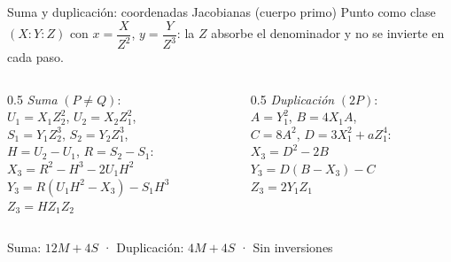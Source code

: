 \documentclass[aspectratio=169,11pt]{beamer}
\begin{document}
\begin{frame}{Suma y duplicación: coordenadas Jacobianas (cuerpo primo)}
  \small
  \setlength{\fboxsep}{2pt}
  \setlength{\parskip}{0pt}
  Punto como clase $(X{:}Y{:}Z)$ con $x=\dfrac{X}{Z^2}$, $y=\dfrac{Y}{Z^3}$:
  la $Z$ absorbe el denominador y \alert{no se invierte en cada paso}.
  \vspace{1ex}
  \begin{columns}[t]
    \begin{column}{0.5\textwidth}
      \emph{Suma} $(P\neq Q)$:\\[0.4ex]
      $U_1{=}X_1Z_2^2$, \quad $U_2{=}X_2Z_1^2$,\\
      $S_1{=}Y_1Z_2^3$, \quad $S_2{=}Y_2Z_1^3$,\\
      $H{=}U_2{-}U_1$, \quad $R{=}S_2{-}S_1$:\\[0.8ex]
      $\boxed{X_3=R^2-H^3-2U_1H^2}$\\[0.5ex]
      $\boxed{Y_3=R(U_1H^2-X_3)-S_1H^3}$\\[0.5ex]
      $\boxed{Z_3=HZ_1Z_2}$
    \end{column}
    \begin{column}{0.5\textwidth}
      \emph{Duplicación} $(2P)$:\\[0.4ex]
      $A{=}Y_1^2$, \quad $B{=}4X_1A$,\\
      $C{=}8A^2$, \quad $D{=}3X_1^2+aZ_1^4$:\\[0.8ex]
      $\boxed{X_3=D^2-2B}$\\[0.5ex]
      $\boxed{Y_3=D(B-X_3)-C}$\\[0.5ex]
      $\boxed{Z_3=2Y_1Z_1}$
    \end{column}
  \end{columns}
  \vspace{1ex}
  Suma: $12M+4S$ \quad · \quad Duplicación: $4M+4S$ \quad · \quad \alert{Sin inversiones}
\end{frame}
\end{document}
